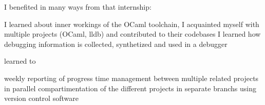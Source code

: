 I benefited in many ways from that internship:

I learned about inner workings of the OCaml toolchain,
I acquainted myself with multiple projects (OCaml, lldb) and contributed to their
codebases
I learned how debugging information is collected, synthetized and used in a debugger

learned to

weekly reporting of progress
time management between multiple related projects in parallel
compartimentation of the different projects in separate branchs using version control
software
